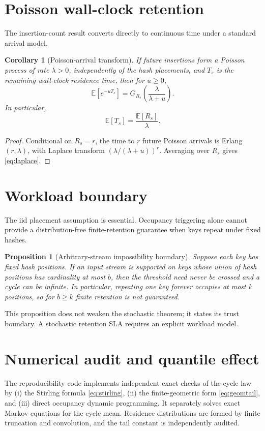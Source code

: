 \documentclass[11pt]{article}
\newtheorem{corollary}{Corollary}
\newtheorem{proposition}{Proposition}
\newcommand{\E}{\mathbb{E}}
\begin{document}
\section{Poisson wall-clock retention}
The insertion-count result converts directly to continuous time under a standard arrival model.

\begin{corollary}[Poisson-arrival transform]
If future insertions form a Poisson process of rate $\lambda>0$, independently of the hash placements, and $T_s$ is the remaining wall-clock residence time, then for $u\ge0$,
\begin{equation}
\boxed{
\E[e^{-uT_s}]
=G_{R_s}\!\left(\frac{\lambda}{\lambda+u}\right).
}
\label{eq:laplace}
\end{equation}
In particular,
\[
\E[T_s]=\frac{\E[R_s]}{\lambda}.
\]
\end{corollary}

\begin{proof}
Conditional on $R_s=r$, the time to $r$ future Poisson arrivals is Erlang$(r,\lambda)$, with Laplace transform $(\lambda/(\lambda+u))^r$. Averaging over $R_s$ gives \eqref{eq:laplace}.
\end{proof}

\section{Workload boundary}
The iid placement assumption is essential. Occupancy triggering alone cannot provide a distribution-free finite-retention guarantee when keys repeat under fixed hashes.

\begin{proposition}[Arbitrary-stream impossibility boundary]
Suppose each key has fixed hash positions. If an input stream is supported on keys whose union of hash positions has cardinality at most $b$, then the threshold need never be crossed and a cycle can be infinite. In particular, repeating one key forever occupies at most $k$ positions, so for $b\ge k$ finite retention is not guaranteed.
\end{proposition}

This proposition does not weaken the stochastic theorem; it states its trust boundary. A stochastic retention SLA requires an explicit workload model.

\section{Numerical audit and quantile effect}
The reproducibility code implements independent exact checks of the cycle law by (i) the Stirling formula \eqref{eq:stirling}, (ii) the finite-geometric form \eqref{eq:geomtail}, and (iii) direct occupancy dynamic programming. It separately solves exact Markov equations for the cycle mean. Residence distributions are formed by finite truncation and convolution, and the tail constant is independently audited.
\end{document}
